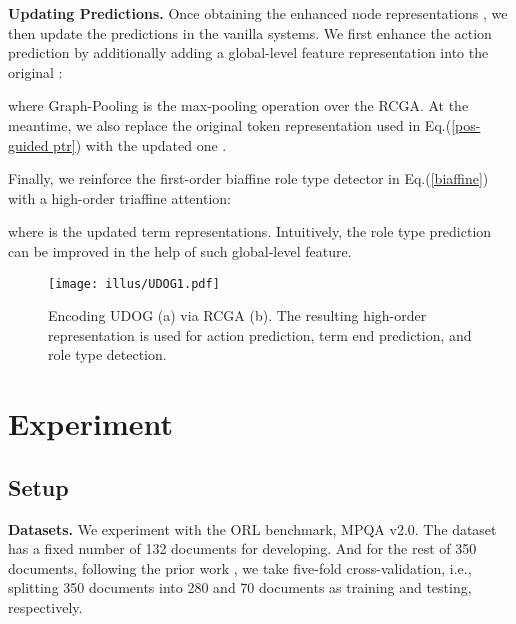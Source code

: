 \documentclass[letterpaper]{article} \usepackage{aaai22}  \usepackage{times}  \usepackage{helvet}  \usepackage{courier}  \usepackage[hyphens]{url}  \usepackage{graphicx} \urlstyle{rm} \def\UrlFont{\rm}  \usepackage{natbib}  \usepackage{caption} \DeclareCaptionStyle{ruled}{labelfont=normalfont,labelsep=colon,strut=off} \frenchspacing  \setlength{\pdfpagewidth}{8.5in}  \setlength{\pdfpageheight}{11in}  \usepackage{algorithm}
\begin{document}
\noindent\textbf{Updating Predictions.}
Once obtaining the enhanced node representations , we then update the predictions in the vanilla systems.
We first enhance the action prediction by additionally adding a global-level feature representation  into the original :
 
where Graph-Pooling is the max-pooling operation over the RCGA.
At the meantime, we also replace the original token representation  used in Eq.(\ref{pos-guided ptr}) with the updated one .


Finally, we reinforce the first-order biaffine role type detector in Eq.(\ref{biaffine}) with a high-order triaffine attention:

where  is the updated term representations.
Intuitively, the role type prediction can be improved in the help of such global-level feature.





\begin{figure}[!t]
\centering
\texttt{[image: illus/UDOG1.pdf]}
\caption{
Encoding UDOG (a) via RCGA (b).
The resulting high-order representation is used for action prediction, term end prediction, and role type detection.
}
\label{UDOS1}
\end{figure} 

















\section{Experiment}








\subsection{Setup}




\noindent\textbf{Datasets.}
We experiment with the ORL benchmark, MPQA v2.0.
The dataset has a fixed number of 132 documents for developing.
And for the rest of 350 documents, following the prior work \cite{zhang-etal-2020-syntax,xia-etal-2021-unified}, we take five-fold cross-validation, i.e., splitting 350 documents into 280 and 70 documents as training and testing, respectively. 
\end{document}
